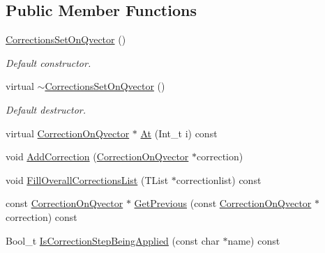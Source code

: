 \subsection*{Public Member Functions}
\begin{DoxyCompactItemize}
\item 
\mbox{\label{classQn_1_1CorrectionsSetOnQvector_a20e825161ee60dd975b854a389d31c75}} 
\mbox{\hyperlink{classQn_1_1CorrectionsSetOnQvector_a20e825161ee60dd975b854a389d31c75}{Corrections\+Set\+On\+Qvector}} ()
\begin{DoxyCompactList}\small\item\em Default constructor. \end{DoxyCompactList}\item 
\mbox{\label{classQn_1_1CorrectionsSetOnQvector_af0fdb3a7fd8ce387a253b187e3cb5b69}} 
virtual \mbox{\hyperlink{classQn_1_1CorrectionsSetOnQvector_af0fdb3a7fd8ce387a253b187e3cb5b69}{$\sim$\+Corrections\+Set\+On\+Qvector}} ()
\begin{DoxyCompactList}\small\item\em Default destructor. \end{DoxyCompactList}\item 
virtual \mbox{\hyperlink{classQn_1_1CorrectionOnQvector}{Correction\+On\+Qvector}} $\ast$ \mbox{\hyperlink{classQn_1_1CorrectionsSetOnQvector_aada04695d30c1c736be32f7ef47df39b}{At}} (Int\+\_\+t i) const
\item 
void \mbox{\hyperlink{classQn_1_1CorrectionsSetOnQvector_abad0a3b5ab01df6e8b8392353cbdbbbe}{Add\+Correction}} (\mbox{\hyperlink{classQn_1_1CorrectionOnQvector}{Correction\+On\+Qvector}} $\ast$correction)
\item 
void \mbox{\hyperlink{classQn_1_1CorrectionsSetOnQvector_a30278af9b844840208baad107e68ea69}{Fill\+Overall\+Corrections\+List}} (T\+List $\ast$correctionlist) const
\item 
const \mbox{\hyperlink{classQn_1_1CorrectionOnQvector}{Correction\+On\+Qvector}} $\ast$ \mbox{\hyperlink{classQn_1_1CorrectionsSetOnQvector_ade101be45b400b1b34f253eed75ccf9f}{Get\+Previous}} (const \mbox{\hyperlink{classQn_1_1CorrectionOnQvector}{Correction\+On\+Qvector}} $\ast$correction) const
\item 
Bool\+\_\+t \mbox{\hyperlink{classQn_1_1CorrectionsSetOnQvector_a5b434f22965975e0131ec0938afcf665}{Is\+Correction\+Step\+Being\+Applied}} (const char $\ast$name) const
\end{DoxyCompactItemize}


